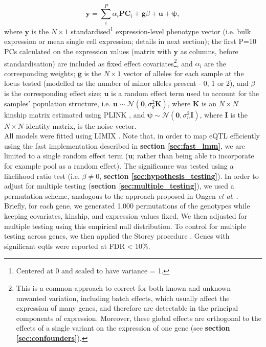 \begin{equation}\label{eq:LMM_ipsc_eqtl}
    \mathbf{y} = \sum_i^{P}\alpha_i \mathbf{PC}_i + \mathbf{g}\beta + \mathbf{u} + \boldsymbol{\psi},  
\end{equation}
where $\mathbf{y}$ is the $N \times 1$ standardised\footnote{Centered at 0 and scaled to have variance = 1.} expression-level phenotype vector (i.e. bulk expression or mean single cell expression; details in next section); the first P=10 PCs calculated on the expression values (matrix with $\mathbf{y}$ as columns, before standardisation) are included as fixed effect covariates\footnote{This is a common approach to correct for both known and unknown unwanted variation, including batch effects, which usually affect the expression of many genes, and therefore are detectable in the principal components of expression. 
Moreover, these global effects are orthogonal to the effects of a single variant on the expression of one gene (see \textbf{section \ref{sec:confounders}}).}, and $\alpha_i$ are the corresponding weights; $\mathbf{g}$ is the $N \times 1$ vector of alleles for each sample at the locus tested (modelled as the number of minor alleles present - 0, 1 or 2), and $\beta$ is the corresponding effect size; $\mathbf{u}$ is a random effect term used to account for the samples' population structure, i.e. $\mathbf{u} \sim \mathcal{N}(\mathbf{0}, \sigma_g^2\mathbf{K})$, where $\mathbf{K}$ is an $N \times N$ kinship matrix estimated using PLINK \cite{purcell2007plink}, and $\boldsymbol{\psi} \sim \mathcal{N}(\mathbf{0}, \sigma_n^2\mathbf{I})$, where $\mathbf{I}$ is the $N \times N$ identity matrix, is the noise vector. \\

All models were fitted using LIMIX \cite{lippert2014limix, casale2015efficient}. 
Note that, in order to map eQTL efficiently using the fast implementation described in \textbf{section \ref{sec:fast_lmm}}, we are limited to a single random effect term ($\mathbf{u}$; rather than being able to incorporate for example pool as a random effect).
The significance was tested using a likelihood ratio test (i.e. $\beta \neq 0$, \textbf{section \ref{sec:hypothesis_testing}}).
In order to adjust for multiple testing (\textbf{section \ref{sec:multiple_testing}}), we used a permutation scheme, analogous to the approach proposed in Ongen \textit{et al}. \cite{ongen2016fast}. 
Briefly, for each gene, we generated 1,000 permutations of the genotypes while keeping covariates, kinship, and expression values fixed. 
We then adjusted for multiple testing using this empirical null distribution.
To control for multiple testing across genes, we then applied the Storey procedure \cite{storey2003statistical}. 
Genes with significant \glspl{eqtl} were reported at FDR < 10\%.


